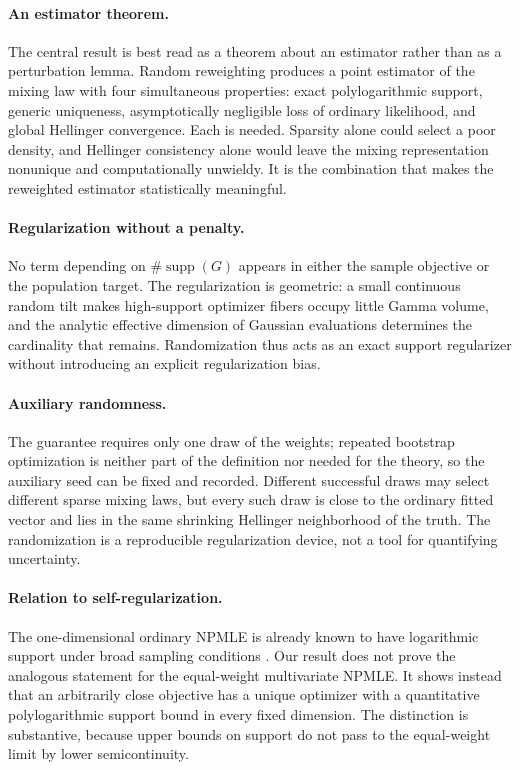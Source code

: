 \documentclass[11pt]{article}
\theoremstyle{definition}
\theoremstyle{remark}
\DeclareMathOperator{\supp}{supp}
\begin{document}
\paragraph{An estimator theorem.}
The central result is best read as a theorem about an estimator rather than
as a perturbation lemma.  Random reweighting produces a point estimator of
the mixing law with four simultaneous properties: exact polylogarithmic
support, generic uniqueness, asymptotically negligible loss of ordinary
likelihood, and global Hellinger convergence.  Each is needed.  Sparsity
alone could select a poor density, and Hellinger consistency alone would
leave the mixing representation nonunique and computationally unwieldy.  It
is the combination that makes the reweighted estimator statistically
meaningful.

\paragraph{Regularization without a penalty.}
No term depending on $\#\supp(G)$ appears in either the sample objective or
the population target.  The regularization is geometric: a small continuous
random tilt makes high-support optimizer fibers occupy little Gamma volume,
and the analytic effective dimension of Gaussian evaluations determines the
cardinality that remains.  Randomization thus acts as an exact support
regularizer without introducing an explicit regularization bias.

\paragraph{Auxiliary randomness.}
The guarantee requires only one draw of the weights; repeated bootstrap
optimization is neither part of the definition nor needed for the theory,
so the auxiliary seed can be fixed and recorded.  Different successful draws
may select different sparse mixing laws, but every such draw is close to the
ordinary fitted vector and lies in the same shrinking Hellinger neighborhood
of the truth.  The randomization is a reproducible regularization device,
not a tool for quantifying uncertainty.

\paragraph{Relation to self-regularization.}
The one-dimensional ordinary NPMLE is already known to have logarithmic
support under broad sampling conditions \citep{polyanskiywu2020}.  Our result
does not prove the analogous statement for the equal-weight multivariate
NPMLE\@.  It shows instead that an arbitrarily close objective has a unique
optimizer with a quantitative polylogarithmic support bound in every fixed
dimension.  The distinction is substantive, because upper bounds on support
do not pass to the equal-weight limit by lower semicontinuity.
\end{document}
